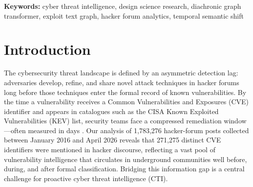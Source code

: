 \documentclass[12pt]{article}
\begin{document}
\begin{titlepage}
\vspace{0.75cm}

\begin{flushleft}
\justifying
\textbf{Keywords:} cyber threat intelligence, design science research, diachronic graph transformer, exploit text graph, hacker forum analytics, temporal semantic shift
\end{flushleft}

\vfill
\end{titlepage}

\newpage
\singlespacing
\centering
\makeatletter
{\fontsize{20}{24}\selectfont\bfseries\titlefont\@title\par}
\makeatother
{}
\normalsize

\vspace{0.5cm}

\section{Introduction}
\normalsize\justifying\bodyfont

The cybersecurity threat landscape is defined by an asymmetric detection lag: adversaries develop, refine, and share novel attack techniques in hacker forums long before those techniques enter the formal record of known vulnerabilities. By the time a vulnerability receives a Common Vulnerabilities and Exposures (CVE) identifier and appears in catalogues such as the CISA Known Exploited Vulnerabilities (KEV) list, security teams face a compressed remediation window---often measured in days \parencite{jacobs2021, cisa2024}. Our analysis of 1,783,276 hacker-forum posts collected between January 2016 and April 2026 reveals that 271,275 distinct CVE identifiers were mentioned in hacker discourse, reflecting a vast pool of vulnerability intelligence that circulates in underground communities well before, during, and after formal classification. Bridging this information gap is a central challenge for proactive cyber threat intelligence (CTI).
\end{document}
